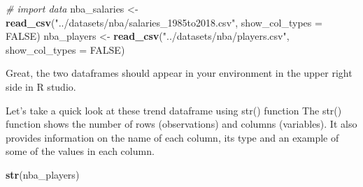\documentclass[
]{book}
\newenvironment{Shaded}{\begin{snugshade}}{\end{snugshade}}
\newcommand{\AttributeTok}[1]{\textcolor[rgb]{0.13,0.29,0.53}{#1}}
\newcommand{\CommentTok}[1]{\textcolor[rgb]{0.56,0.35,0.01}{\textit{#1}}}
\newcommand{\ConstantTok}[1]{\textcolor[rgb]{0.56,0.35,0.01}{#1}}
\newcommand{\FunctionTok}[1]{\textcolor[rgb]{0.13,0.29,0.53}{\textbf{#1}}}
\newcommand{\NormalTok}[1]{#1}
\newcommand{\OtherTok}[1]{\textcolor[rgb]{0.56,0.35,0.01}{#1}}
\newcommand{\StringTok}[1]{\textcolor[rgb]{0.31,0.60,0.02}{#1}}
\begin{document}
\begin{Shaded}
\begin{Highlighting}[]
\CommentTok{\# import data }
\NormalTok{nba\_salaries }\OtherTok{\textless{}{-}} \FunctionTok{read\_csv}\NormalTok{(}\StringTok{"../datasets/nba/salaries\_1985to2018.csv"}\NormalTok{, }\AttributeTok{show\_col\_types =} \ConstantTok{FALSE}\NormalTok{)}
\NormalTok{nba\_players }\OtherTok{\textless{}{-}} \FunctionTok{read\_csv}\NormalTok{(}\StringTok{"../datasets/nba/players.csv"}\NormalTok{, }\AttributeTok{show\_col\_types =} \ConstantTok{FALSE}\NormalTok{)}
\end{Highlighting}
\end{Shaded}

Great, the two dataframes should appear in your environment in the upper right side in R studio.

Let's take a quick look at these trend dataframe using str() function The str() function shows the number of rows (observations) and columns (variables). It also provides information on the name of each column, its type and an example of some of the values in each column.

\begin{Shaded}
\begin{Highlighting}[]
\FunctionTok{str}\NormalTok{(nba\_players)}
\end{Highlighting}
\end{Shaded}
\end{document}

